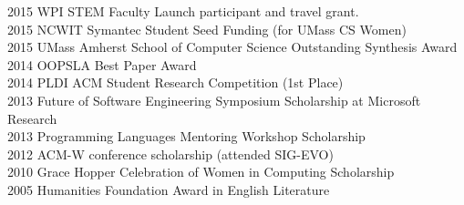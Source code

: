 \documentclass[10pt]{article}
\newcommand{\cvsec}[2]{
    \begin{tcolorbox}[width=\textwidth, breakable, title={#1}]
        #2
    \end{tcolorbox}
    \vspace{10pt}
}
\begin{document}
\cvsec{Honors, Scholarships, and Awards}{
  2015 WPI STEM Faculty Launch participant and travel grant.\\
  2015 NCWIT Symantec Student Seed Funding (for UMass CS Women)\\
  2015 UMass Amherst School of Computer Science Outstanding Synthesis Award\\
  2014 OOPSLA Best Paper Award\\
  2014 PLDI ACM Student Research Competition (1st Place)\\
  2013 Future of Software Engineering Symposium Scholarship at Microsoft Research\\
  2013 Programming Languages Mentoring Workshop Scholarship\\
  2012 ACM-W conference scholarship (attended SIG-EVO)\\
  2010 Grace Hopper Celebration of Women in Computing Scholarship\\
  2005 Humanities Foundation Award in English Literature\\
}
\end{document}
